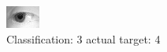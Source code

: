 \begin{figure}[h!]
\begin{center}
\includegraphics[width=0.60\columnwidth]{figures/ID1242_class_3_target_4.png}
\end{center}
\caption{ Classification: 3 actual target: 4}
\label{fig:ID1242_class_3_target_4}
\end{figure}
